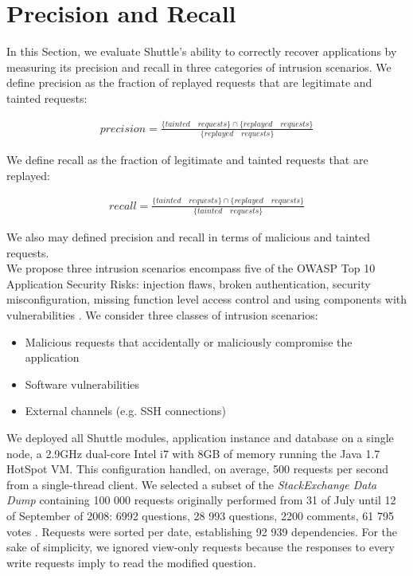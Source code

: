 \section{Precision and Recall}\label{sec:eval:accuracy}

In this Section, we evaluate Shuttle's ability to correctly recover applications by measuring its precision and recall in three categories of intrusion scenarios. We define precision as the fraction of replayed requests that are legitimate and tainted requests: 

\begin{gather*} 
precision = \frac{ \{tainted \quad requests\} \cap \{replayed \quad requests\}}{\{replayed \quad requests\}}
\end{gather*}

We define recall as the fraction of legitimate and tainted requests that are replayed: 

\begin{gather*} 
recall = \frac{ \{tainted \quad requests\} \cap \{replayed \quad requests\}}{\{tainted \quad requests\}}
\end{gather*}

We also may defined precision and recall in terms of malicious and tainted requests. \\

We propose three intrusion scenarios encompass five of the \ac{OWASP} Top 10 Application Security Risks: injection flaws, broken authentication, security misconfiguration, missing function level access control and using components with vulnerabilities \cite{Williams2013}. We consider three classes of intrusion scenarios:

\begin{itemize}
  \item Malicious requests that accidentally or maliciously compromise the application
  \item Software vulnerabilities
  \item External channels (e.g. \ac{SSH} connections)
\end{itemize}

We deployed all Shuttle modules, application instance and database on a single node, a 2.9GHz dual-core Intel i7 with 8GB of memory running the Java 1.7 HotSpot \ac{VM}. This configuration handled, on average, 500 requests per second from a single-thread client. We selected a subset of the \textit{StackExchange Data Dump} \cite{stackexchange_data} containing 100 000 requests originally performed from 31 of July until 12 of September of 2008: 6992 questions, 28 993 questions, 2200 comments, 61 795 votes . Requests were sorted per date, establishing 92 939 dependencies. For the sake of simplicity, we ignored view-only requests because the responses to every write requests imply to read the modified question.  


